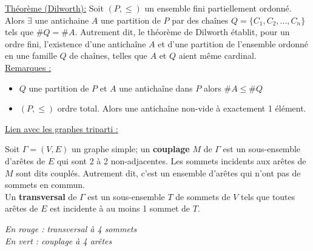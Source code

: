 \documentclass[11pt]{article}
\begin{document}
		\underline{Théorème (Dilworth):} Soit $(P,\leq)$ un ensemble fini partiellement ordonné. Alors $\exists$ une antichaine $A$ une partition de $P$ par des chaînes $Q=\{C_1,C_2,...,C_n\}$ tels que $\#Q=\#A$. Autrement dit, le théorème de Dilworth établit, pour un ordre fini, l'existence d'une antichaîne $A$ et d'une partition de l'ensemble ordonné en une famille $Q$ de chaînes, telles que $A$ et $Q$ aient même cardinal.\\
		
		\underline{Remarques :}
		\begin{itemize}
			\item $Q$ une partition de $P$ et $A$ une antichaîne dans $P$ alors $\#A \leq \#Q$
			\item $(P,\leq)$ ordre total. Alors une antichaîne non-vide à exactement 1 élément.
		\end{itemize}

		\underline{Lien avec les graphes triparti :}
		
		Soit $\Gamma=(V,E)$ un graphe simple; un \textbf{couplage} $M$ de $\Gamma$ est un sous-ensemble d'arêtes de $E$ qui sont 2 à 2 non-adjacentes. Les sommets incidents aux arêtes de $M$ sont dits couplés. Autrement dit, c'est un ensemble d'arêtes qui n'ont pas de sommets en commun.\\
		
		Un \textbf{transversal} de $\Gamma$ est un sous-ensemble $T$ de sommets de $V$ tels que toutes arêtes de $E$ est incidente à au moins 1 sommet de $T$.\\
			
		\begin{minipage}{0.5\textwidth}
            		\centering
            			\end{minipage}\hfill
            			\begin{minipage}{0.5\textwidth}
            			\centering
			 	\textit{En rouge : transversal à 4 sommets\\
            			En vert : couplage à 4 arêtes}
            	\end{minipage}\\
\end{document}
